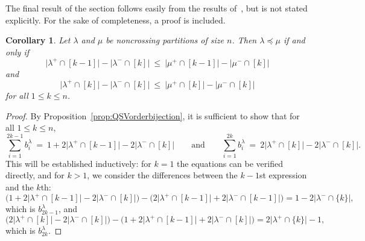\documentclass[12pt]{amsart}
\newtheorem{cor}[equation]{Corollary}
\theoremstyle{definition}
\theoremstyle{remark}
\numberwithin{equation}{section}
\begin{document}
The final result of the section follows easily from the results of~\cite{GobetWilliams}, but is not stated explicitly.  For the sake of completeness, a proof is included.

\begin{cor}
\label{cor:bruhatncphelper}
Let $\lambda$ and $\mu$ be noncrossing partitions of size $n$.  Then $\lambda \preceq \mu$ if and only if 
\[
\big|\lambda^{+} \cap [k-1]\big| - \big|\lambda^{-} \cap [k]\big| \ \le\  \big|\mu^{+} \cap [k-1]\big| - \big|\mu^{-} \cap [k]\big|
\]
and
\[
\big|\lambda^{+} \cap [k]\big| - \big|\lambda^{-} \cap [k]\big|\  \le \  \big|\mu^{+} \cap [k]\big| - \big|\mu^{-} \cap [k]\big| 
\]
for all $1 \le k \le n$.
\end{cor}
\begin{proof}
By Proposition~\ref{prop:QSVorderbijection}, it is sufficient to show that for all $1 \le k \le n$,
\[
\sum_{i = 1}^{2k - 1} b^{\lambda}_{i}  \ = \ 1 + 2\big|\lambda^{+} \cap [k-1]\big| - 2\big|\lambda^{-} \cap [k]\big|
\qquad\text{and}\qquad
\sum_{i = 1}^{2k} b^{\lambda}_{i} \  = \ 2\big|\lambda^{+} \cap [k]\big| - 2\big|\lambda^{-} \cap [k]\big|.
\] 
This will be established inductively: for $k = 1$ the equations can be verified directly, and for $k > 1$, we consider the differences between the $k-1$st expression and the $k$th: 
\[
\Big(1 + 2\big|\lambda^{+} \cap [k-1]\big| - 2\big|\lambda^{-} \cap [k]\big|\Big) - \Big(2\big|\lambda^{+} \cap [k-1]\big| + 2\big|\lambda^{-} \cap [k-1]\big|\Big)
= 1 - 2\big|\lambda^{-} \cap \{k\}\big|,
\]
which is $b^{\lambda}_{2k-1}$, and 
\[
\Big(2\big|\lambda^{+} \cap [k]\big| - 2\big|\lambda^{-} \cap [k]\big|\Big) - \Big(1 + 2\big|\lambda^{+} \cap [k-1]\big| + 2\big|\lambda^{-} \cap [k]\big|\Big) = 2\big|\lambda^{+} \cap \{k\}\big| - 1,
\]
which is $b^{\lambda}_{2k}$.
\end{proof}
\end{document}
